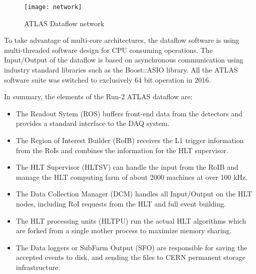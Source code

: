 \begin{figure}[t!]
\centering
\texttt{[image: network]} 
\caption{ATLAS Dataflow network}
\label{fig:net_diagram}
\end{figure} 

To take advantage of multi-core architectures, the dataflow
 software is using multi-threaded software design for CPU consuming operations.
The Input/Output of the dataflow is based on asynchronous communication using industry standard libraries
such as the Boost::ASIO library. All the ATLAS software suite was switched to exclusively 64 bit operation in 2016.



In summary, the elements of the Run-2 ATLAS dataflow are:

\begin{itemize}
\item The Readout Sytem (ROS) buffers front-end data from the detectors and provides a standard interface to the DAQ system.
\item The Region of Interest Builder (RoIB) receives the L1 trigger information from the RoIs and combines the information for the HLT supervisor.
\item The HLT Supervisor (HLTSV) can handle the input from the RoIB and manage the HLT computing farm of about 2000 machines at 
over 100 kHz.
\item The Data Collection Manager (DCM) handles all Input/Output on the HLT nodes, including RoI requests from the HLT and full event building.
\item The HLT processing units (HLTPU) run the actual HLT algorithms which 
are forked from a single mother process to maximize memory sharing.
\item The Data loggers or SubFarm Output (SFO) are responsible for saving the 
accepted events to disk, and sending the files to CERN permanent storage infrastructure.
\end{itemize}



